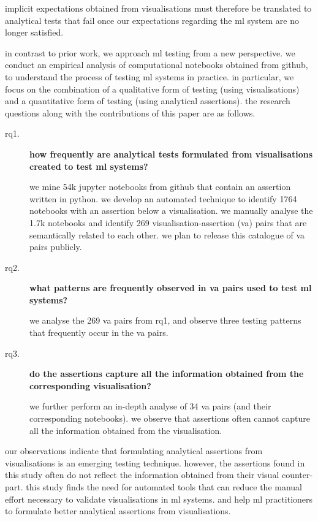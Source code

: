 implicit expectations obtained from visualisations must therefore be
translated to analytical tests that fail once our expectations
regarding the ml system are no longer satisfied.

in contrast to prior work, we approach ml testing from a new
perspective. we conduct an empirical analysis of computational
notebooks obtained from github, to understand the process of testing
ml systems in practice. in particular, we focus on the combination of
a qualitative form of testing (using visualisations) and a
quantitative form of testing (using analytical assertions). the
research questions along with the contributions of this paper are as
follows.

\begin{description}
  \item[rq1.] \textbf{how frequently are analytical tests formulated
    from visualisations created to test ml systems?}

    we mine 54k jupyter notebooks from github that contain an assertion
    written in python. we develop an automated technique to identify 1764
    notebooks with an assertion below a visualisation. we manually analyse
    the 1.7k notebooks and identify 269 visualisation-assertion (va) pairs
    that are semantically related to each other. we plan to release this
    catalogue of va pairs publicly.

\item[rq2.] \textbf{what patterns are frequently observed in va pairs
  used to test ml systems?}

  we analyse the 269 va pairs from rq1, and observe three testing
  patterns that frequently occur in the va pairs.

\item[rq3.] \textbf{do the assertions capture all the information
  obtained from the corresponding visualisation?}

  we further perform an in-depth analyse of 34 va pairs (and their
  corresponding notebooks). we observe that assertions often cannot
  capture all the information obtained from the visualisation.

\end{description}

our observations indicate that formulating analytical assertions from
visualisations is an emerging testing technique. however, the
assertions found in this study often do not reflect the information
obtained from their visual counter-part. this study finds the need for
automated tools that can reduce the manual effort necessary to
validate visualisations in ml systems. and help ml practitioners to
formulate better analytical assertions from visualisations.

